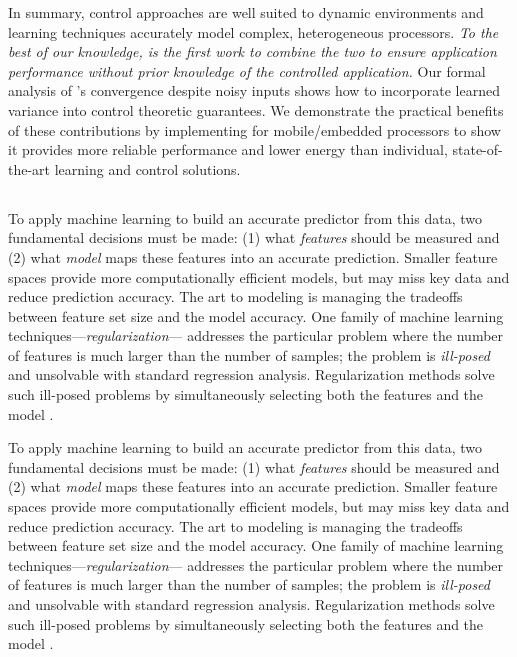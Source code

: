 In summary, control approaches are well suited to dynamic environments
and learning techniques accurately model complex, heterogeneous
processors.  \emph{To the best of our knowledge, \SYSTEM{} is the
  first work to combine the two to ensure application performance
  without prior knowledge of the controlled application.}  Our formal
analysis of \SYSTEM{}'s convergence despite noisy inputs shows how to
incorporate learned variance into control theoretic guarantees.  We
demonstrate the practical benefits of these contributions by
implementing \SYSTEM{} for mobile/embedded processors to show it
provides more reliable performance and lower energy than individual,
state-of-the-art learning and control solutions.

\subsection{\SYSTEMESP{}}
To apply machine learning to build an
accurate predictor from this data, two fundamental decisions must be
made: (1) what \emph{features} should be measured and (2) what
\emph{model} maps these features into an accurate prediction.  Smaller
feature spaces provide more computationally efficient models, but
may miss key data and reduce prediction accuracy.  The art to modeling
is managing the tradeoffs between feature set size and the model
accuracy.  One family of machine learning
techniques---\emph{regularization}--- addresses the particular problem
where the number of features is much larger than the number of
samples; \ie the problem is \emph{ill-posed} and unsolvable with
standard regression analysis.  Regularization methods solve such
ill-posed problems by simultaneously selecting both the features and
the model
\cite{hoerl1988ridge,tibshirani1996regression,zou2005regularization}.

To apply machine learning to build an
accurate predictor from this data, two fundamental decisions must be
made: (1) what \emph{features} should be measured and (2) what
\emph{model} maps these features into an accurate prediction.  Smaller
feature spaces provide more computationally efficient models, but
may miss key data and reduce prediction accuracy.  The art to modeling
is managing the tradeoffs between feature set size and the model
accuracy.  One family of machine learning
techniques---\emph{regularization}--- addresses the particular problem
where the number of features is much larger than the number of
samples; \ie the problem is \emph{ill-posed} and unsolvable with
standard regression analysis.  Regularization methods solve such
ill-posed problems by simultaneously selecting both the features and
the model
\cite{hoerl1988ridge,tibshirani1996regression,zou2005regularization}.

